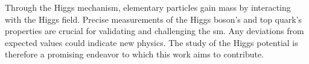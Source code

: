 Through the Higgs mechanism, elementary particles gain mass by interacting with the Higgs field. Precise measurements of the Higgs boson's and top quark's properties are crucial for validating and challenging the \ac{sm}. Any deviations from expected values could indicate new physics. The study of the Higgs potential is therefore a promising endeavor to which this work aims to contribute.
